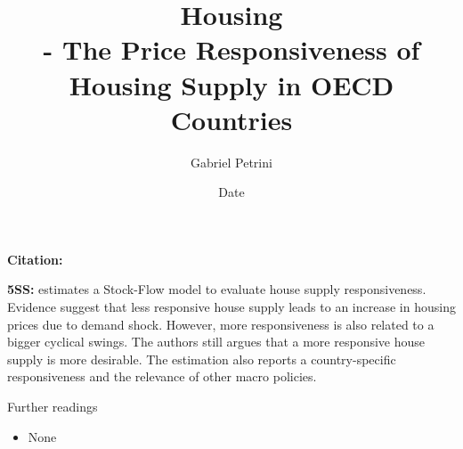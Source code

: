 \documentclass[10pt,lineno]{../_configs}
\title{
\large{Housing}\vspace{2pt}\\
\Huge{\autor - The Price Responsiveness of Housing Supply in OECD Countries}
}
\date{Date}
\author[$\ast$]{Gabriel Petrini}
\affil[$\ast$]{PhD Student at Unicamp.}
\newcommand{\autor}{\textcite{sanchez_price_2011} }
\begin{document}
\maketitle
\articletypemark
\marginmark
\thispagestyle{firststyle}

\noindent \textbf{Citation:} 	

\begin{infobox}
	\textbf{5SS:} \autor estimates a Stock-Flow model to evaluate house supply responsiveness. Evidence suggest that less responsive house supply leads to an increase in housing prices due to demand shock. However, more responsiveness is also related to a bigger cyclical swings. The authors still argues that a more responsive house supply is more desirable. The estimation also reports a country-specific responsiveness and the relevance of other macro policies.
\end{infobox}

\begin{redbox}{Further readings}
	\begin{itemize}
		\item None
	\end{itemize}
\end{redbox}

\printbibliography
	
\end{document}
